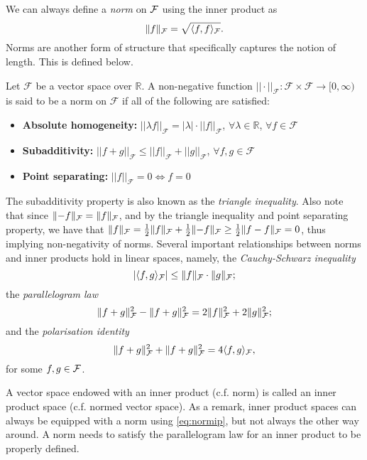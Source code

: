 We can always define a \emph{norm} on ${\mathcal F}$ using the inner product as 
\begin{equation}\label{eq:normip}
  \lVert f\rVert_{\mathcal F} = \sqrt{\langle f,f\rangle_{\mathcal F}}.
\end{equation}
Norms are another form of structure that specifically captures the notion of length. 
This is defined below.

\begin{definition}[Norms]
	Let $\mathcal F$ be a vector space over $\mathbb R$. A non-negative function $||\cdot||_{\mathcal F}:\mathcal F \times \mathcal F \rightarrow \mathbb [0,\infty)$ is said to be a norm  on $\mathcal F$ if all of the following are satisfied:
	\begin{itemize}
	\item \textbf{Absolute homogeneity:} $||\lambda f||_{\mathcal F} = |\lambda| \cdot ||f||_{\mathcal F}$, $\forall \lambda \in \mathbb R$, $\forall f \in \mathcal F$
	\item \textbf{Subadditivity:} $||f+g||_{\mathcal F} \leq ||f||_{\mathcal F} + ||g||_{\mathcal F}$, $\forall f,g \in \mathcal F$
	\item \textbf{Point separating:} $||f||_{\mathcal F} = 0 \Leftrightarrow f=0$
	\end{itemize}
\end{definition}

The subadditivity property is also known as the \emph{triangle inequality}.
Also note that since $\lVert-f\rVert_{\mathcal F} = \lVert f\rVert_{\mathcal F}$, and by the triangle inequality and point separating property, we have that $\lVert f\rVert_{\mathcal F} = \frac{1}{2}\lVert f\rVert_{\mathcal F} + \frac{1}{2}\lVert-f\rVert_{\mathcal F} \geq \frac{1}{2}\lVert f - f\rVert_{\mathcal F} = 0$, thus implying non-negativity of norms.
Several important relationships between norms and inner products hold in linear spaces, namely, the \emph{Cauchy-Schwarz inequality}
\[
  |\langle f,g\rangle_{\mathcal F}| \leq \lVert f\rVert_{\mathcal F}\cdot\lVert g\rVert_{\mathcal F};
\]
the \emph{parallelogram law}
\[
  \lVert f+g\rVert_{\mathcal F}^2 - \lVert f+g\rVert_{\mathcal F}^2 = 2\lVert f\rVert_{\mathcal F}^2 + 2\lVert g\rVert_{\mathcal F}^2;
\]
and the \emph{polarisation identity}
\[
  \lVert f+g\rVert_{\mathcal F}^2 + \lVert f+g\rVert_{\mathcal F}^2 = 4\langle f,g\rangle_{\mathcal F},
\]
for some $f,g\in{\mathcal F}$.

A vector space endowed with an inner product (c.f. norm) is called an inner product space (c.f. normed vector space).
As a remark, inner product spaces can always be equipped with a norm using \cref{eq:normip}, but not always the other way around.
A norm needs to satisfy the parallelogram law for an inner product to be properly defined.

